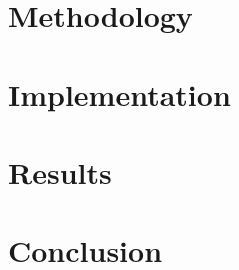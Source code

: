 \documentclass{article} %
\theoremstyle{plain}
\theoremstyle{definition}
\theoremstyle{remark}
\begin{document}
\section{Methodology}\label{sec:methodology}


% 

\section{Implementation}\label{sec:implementation}


\section{Results}\label{sec:results}


\section{Conclusion}\label{sec:conclusion}








\appendix



% 





\end{document}
